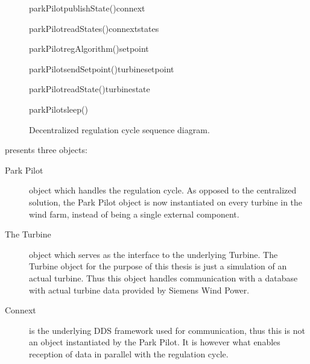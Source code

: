 \begin{figure}[!h]
	\centering
	\begin{sequencediagram} %
		
		\begin {messcall}{parkPilot}{publishState()}{connext}{}
		\end {messcall}
		\begin {call}{parkPilot}{readStates()}{connext}{states}
		\end {call}
		\begin {callself}{parkPilot}{regAlgorithm()}{setpoint}
		\end {callself}
		\begin {call}{parkPilot}{sendSetpoint()}{turbine}{setpoint}
		\end {call}
		\begin {call}{parkPilot}{readState()}{turbine}{state}
		\end {call}	
		\begin {callself}{parkPilot}{sleep()}{}
		\end {callself}			
	\end{sequencediagram}

	\caption[Decentralized regulation cycle sequence diagram]{
		\label{fig:decenRegCycle} 
		\footnotesize{%
			Decentralized regulation cycle sequence diagram.
		}
	}
\end{figure}

 presents three objects:

\begin{description}
	\item [Park Pilot] object which handles the regulation cycle. As opposed to the centralized solution, the Park Pilot object is now instantiated on every turbine in the wind farm, instead of being a single external component.
	\item [The Turbine] object which serves as the interface to the underlying Turbine. The Turbine object for the purpose of this thesis is just a simulation of an actual turbine. Thus this object handles communication with a database with actual turbine data provided by Siemens Wind Power.
	\item [Connext] is the underlying DDS framework used for communication, thus this is not an object instantiated by the Park Pilot. It is however what enables reception of data in parallel with the regulation cycle. 
\end{description}


